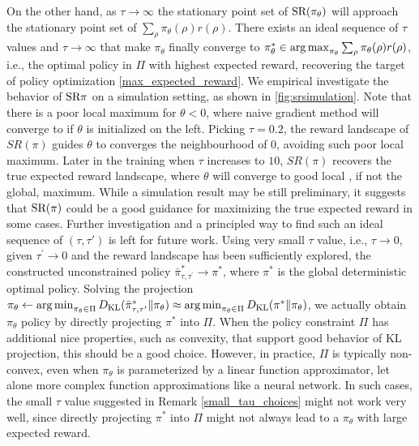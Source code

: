On the other hand, as $\tau \to \infty$ the stationary point set of $\text{SR}(\pi_\theta)$ will approach the stationary point set of $\sum_{\rho}{ \pi_\theta(\rho) r(\rho) }$.
There exists an ideal sequence of $\tau$ values and $\tau \to \infty$ that make $\pi_\theta$ finally converge to $\pi_\theta^* \in \operatorname*{arg\,max}_{\pi_\theta}{ \sum_{\rho}{\pi_\theta(\rho) r(\rho)} }$, i.e., the optimal policy in $\Pi$ with highest expected reward, recovering the target of policy optimization \cref{max_expected_reward}. 
We empirical investigate the behavior of $\text{SR}{\pi}$ on a simulation setting, as shown in \cref{fig:srsimulation}.
Note that there is a poor local maximum for $\theta <0$, where naive gradient method will converge to if $\theta$ is initialized on the left. 
Picking $\tau = 0.2$, the reward landscape of $SR(\pi)$ guides $\theta$ to converges the neighbourhood of $0$, avoiding such poor local maximum. Later in the training when $\tau$ increases to $10$, $SR(\pi)$ recovers the true expected reward landscape, where $\theta$ will converge to good local , if not the global, maximum.
While a simulation result may be still preliminary, it suggests that $\text{SR}(\pi)$ could be a good guidance for maximizing the true expected reward in some cases.
Further investigation and a principled way to find such an ideal sequence of $(\tau,\tau')$ is left for future work.
Using very small $\tau$ value, i.e., $\tau \to 0$, given $\tau^{\prime} \to 0$ and the reward landscape has been sufficiently explored, the constructed unconstrained policy $\bar{\pi}_{\tau,\tau^{\prime}}^* \to \pi^*$, where $\pi^*$ is the global deterministic optimal policy. Solving the projection $\pi_\theta \leftarrow \operatorname*{arg\,min}_{\pi_\theta \in \Pi}{D_{\mathrm{KL}}(\bar{\pi}_{\tau,\tau^{\prime}}^* \| \pi_\theta}) \approx \operatorname*{arg\,min}_{\pi_\theta \in \Pi}{D_{\mathrm{KL}}(\pi^* \| \pi_\theta})$, we actually obtain $\pi_\theta$ policy by directly projecting $\pi^*$ into $\Pi$. When the policy constraint $\Pi$ has additional nice properties, such as convexity, that support good behavior of KL projection, this should be a good choice.
However, in practice, $\Pi$ is typically non-convex, even when $\pi_\theta$ is parameterized by a linear function approximator, let alone more complex function approximations like a neural network. In such cases, the small $\tau$ value suggested in Remark \ref{small_tau_choices} might not work very well, since directly projecting $\pi^*$ into $\Pi$ might not always lead to a $\pi_\theta$ with large expected reward.

